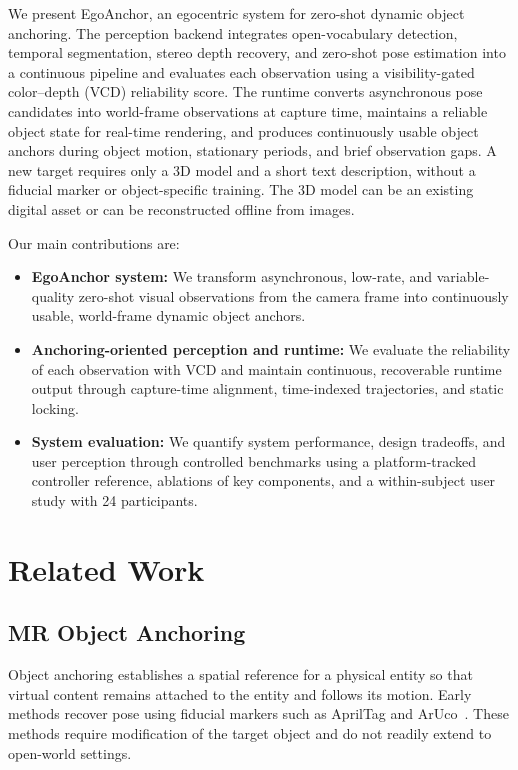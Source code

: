 \documentclass[review]{vgtc}
\begin{document}
We present EgoAnchor, an egocentric system for zero-shot dynamic object anchoring. The perception backend integrates open-vocabulary detection, temporal segmentation, stereo depth recovery, and zero-shot pose estimation into a continuous pipeline and evaluates each observation using a visibility-gated color--depth (VCD) reliability score. The runtime converts asynchronous pose candidates into world-frame observations at capture time, maintains a reliable object state for real-time rendering, and produces continuously usable object anchors during object motion, stationary periods, and brief observation gaps. A new target requires only a 3D model and a short text description, without a fiducial marker or object-specific training. The 3D model can be an existing digital asset or can be reconstructed offline from images.

Our main contributions are:
\begin{itemize}
  \item \textbf{EgoAnchor system:} We transform asynchronous, low-rate, and variable-quality zero-shot visual observations from the camera frame into continuously usable, world-frame dynamic object anchors.
  \item \textbf{Anchoring-oriented perception and runtime:} We evaluate the reliability of each observation with VCD and maintain continuous, recoverable runtime output through capture-time alignment, time-indexed trajectories, and static locking.
  \item \textbf{System evaluation:} We quantify system performance, design tradeoffs, and user perception through controlled benchmarks using a platform-tracked controller reference, ablations of key components, and a within-subject user study with 24 participants.
\end{itemize}

\section{Related Work}\label{sec:related-work}

\subsection{MR Object Anchoring}

Object anchoring establishes a spatial reference for a physical entity so that virtual content remains attached to the entity and follows its motion. Early methods recover pose using fiducial markers such as AprilTag and ArUco~\cite{apriltag2011,aruco2014}. These methods require modification of the target object and do not readily extend to open-world settings.
\end{document}
